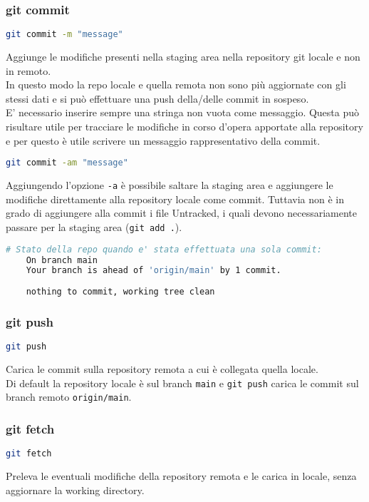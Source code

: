 \subsubsection{git commit}
\begin{lstlisting}[language=bash]
	git commit -m "message"
\end{lstlisting}
Aggiunge le modifiche presenti nella staging area nella repository git locale e non in remoto.\\
In questo modo la repo locale e quella remota non sono più aggiornate con gli stessi dati e si può effettuare una push della/delle commit in sospeso.\\
E' necessario inserire sempre una stringa non vuota come messaggio. Questa può risultare utile per tracciare le modifiche in corso d'opera apportate alla repository e per questo è utile scrivere un messaggio rappresentativo della commit.
\begin{lstlisting}[language=bash]
	git commit -am "message"
\end{lstlisting}
Aggiungendo l'opzione \texttt{-a} è possibile saltare la staging area e aggiungere le modifiche direttamente alla repository locale come commit. Tuttavia non è in grado di aggiungere alla commit i file Untracked, i quali devono necessariamente passare per la staging area (\texttt{git add .}).\\
\begin{lstlisting}[language=bash]
	# Stato della repo quando e' stata effettuata una sola commit: 
	On branch main
	Your branch is ahead of 'origin/main' by 1 commit.
	
	nothing to commit, working tree clean
\end{lstlisting}

\subsubsection{git push}
\begin{lstlisting}[language=bash]
	git push
\end{lstlisting}
Carica le commit sulla repository remota a cui è collegata quella locale.\\
Di default la repository locale è sul branch \texttt{main} e \texttt{git push} carica le commit sul branch remoto \texttt{origin/main}.

\subsubsection{git fetch}
\begin{lstlisting}[language=bash]
	git fetch
\end{lstlisting}
Preleva le eventuali modifiche della repository remota e le carica in locale, senza aggiornare la working directory.

